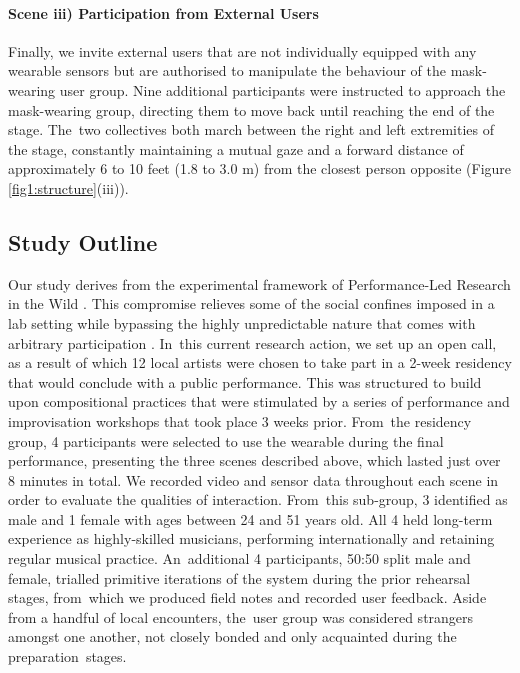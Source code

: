 \paragraph{Scene iii) Participation from External Users}

Finally, we invite external users that are not individually equipped with any wearable sensors but are authorised to manipulate the behaviour of the mask-wearing user group. Nine additional participants were instructed to approach the mask-wearing group, directing them to move back until reaching the end of the stage. The~two collectives both march between the right and left extremities of the stage, constantly maintaining a mutual gaze and a forward distance of approximately 6 to 10 feet (1.8 to 3.0 m) from the closest person opposite (Figure \ref{fig1:structure}(iii)).


\subsection*{Study Outline}

Our study derives from the experimental framework of Performance-Led Research in the Wild \citep{benford_performance-led_2013}. This compromise relieves some of the social confines imposed in a lab setting while bypassing the highly unpredictable nature that comes with arbitrary participation \citep{heron_par_2017}. In~this current research action, we set up an open call, as a result of which 12 local artists were chosen to take part in a 2-week residency that would conclude with a public performance. This was structured to build upon compositional practices that were stimulated by a series of performance and improvisation workshops that took place 3 weeks prior. From~the residency group, 4 participants were selected to use the wearable during the final performance, presenting the three scenes described above, which lasted just over 8 minutes in total. We recorded video and sensor data throughout each scene in order to evaluate the qualities of interaction. From~this sub-group, 3 identified as male and 1 female with ages between 24 and 51 years old. All 4 held long-term experience as highly-skilled musicians, performing internationally and retaining regular musical practice. An~additional 4 participants, 50:50 split male and female, trialled primitive iterations of the system during the prior rehearsal stages, from~which we produced field notes and recorded user feedback. Aside from a handful of local encounters, the~user group was considered strangers amongst one another, not closely bonded and only acquainted during the preparation~stages.

